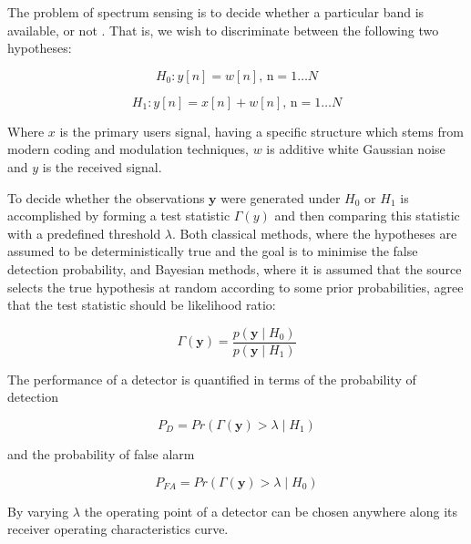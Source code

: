 \documentclass[conference]{IEEEtran}
\begin{document}
The problem of spectrum sensing is to decide whether a particular band is available, or not \cite{Y}. That is, we wish to discriminate between the following two hypotheses:

\begin{equation}
H_{0}: y\left[n\right] = w\left[n\right] \text{, n} =  1 \ldots N 
\end{equation}
\label{h1}

\begin{equation}
H_{1}: y\left[n \right] = x\left[n\right] + w\left[n\right] \text{, n} =  1 \ldots N 
\end{equation}
\label{h2}

Where \(x\) is the primary users signal, having a specific structure which stems from modern coding and modulation techniques, \(w\) is additive white Gaussian noise and \(y\) is the received signal.

To decide whether the observations \(\textbf{y}\) were generated under \(\textit{H}_{0}\) or \(\textit{H}_{1}\) is accomplished by forming a test statistic \(\Gamma\left(y\right)\) and then comparing this statistic with a predefined threshold \(\lambda\). Both classical methods, where the hypotheses are assumed to be deterministically true and the goal is to minimise the false detection probability, and Bayesian methods, where it is assumed that the source selects the true hypothesis at random according to some prior probabilities, agree that the test statistic should be likelihood ratio:

\begin{equation}
\Gamma\left(\textbf{y}\right) = \frac{p\left(\textbf{y}\mid H_0\right)}{p\left(\textbf{y}\mid H_1\right)}
\end{equation}

The performance of a detector is quantified in terms of the probability of detection

\begin{equation}
P_{D} = Pr\left( \Gamma\left(\textbf{y}\right) > \lambda \mid H_1\right)
\end{equation}

and the probability of false alarm 

\begin{equation}
P_{FA} = Pr\left( \Gamma\left(\textbf{y}\right) > \lambda \mid H_0\right)
\end{equation}

By varying \(\lambda\) the operating point of a detector can be chosen anywhere along its receiver operating characteristics curve.
\end{document}
